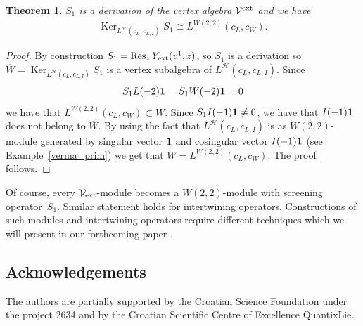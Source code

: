 \documentclass[pdftex]{sigma}
\numberwithin{equation}{section}
\newtheorem{Theorem}{Theorem}[section]
\newcommand{\HVir}{\mathcal H}
\DeclareMathOperator{\Ker}{Ker}
\begin{document}
\begin{Theorem}
$S_1$ is a derivation of the vertex algebra $\mathcal V^{\rm ext}$ and we have
\begin{gather*}
\Ker_{ L^{\HVir} (c_L,c_{L,I}) } S_1 \cong L ^{W(2,2)} (c_L, c_W ).
\end{gather*}
\end{Theorem}
\begin{proof}
By construction $S_1 = \operatorname{Res}_z Y_{\rm ext} (v^1, z)$, so $S_1$ is a derivation so $\overline W = \Ker_{ L^{\HVir} (c_L,c_{L,I}) } S_1$ is a vertex subalgebra of $L^{\HVir} (c_L,c_{L,I})$. Since
\begin{gather*}
S_1 L(-2) {\bf 1} = S_1 W(-2) {\bf 1} = 0
\end{gather*}
we have that $L ^{W(2,2)} (c_L, c_W ) \subset \overline W$. Since $S_1 I (-1) {\bf 1} \ne 0$, we have that $I(-1) {\bf 1}$ does not belong to $\overline W$. By using the fact that $L^{\HVir} (c_L,c_{L,I})$ is as $W(2,2)$-module generated by singular vector $\bf{1}$ and cosingular vector $I(-1) {\bf 1}$ (see Example~\ref{verma_prim}) we get that $\overline W = L ^{W(2,2)} (c_L, c_W )$. The proof follows.
\end{proof}

\begin{Remark}
Of course, every $\mathcal V_{\rm ext}$-module becomes a $W(2,2)$-module with screening opera\-tor~$S_1$. Similar statement holds for intertwining operators. Constructions of such modules and intertwining operators require dif\/ferent techniques which we will present in our forthcoming paper \cite{AR2}.
\end{Remark}

\subsection*{Acknowledgements}
The authors are partially supported by the Croatian Science Foundation under the project 2634 and by the Croatian Scientif\/ic Centre of Excellence QuantixLie.
\end{document}
